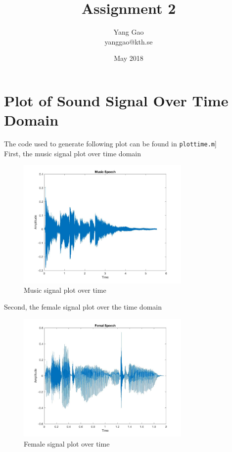 \documentclass{article}
\title{Assignment 2}
\author{Yang Gao\\
        yanggao@kth.se}
\date{May 2018}
\begin{document}
    \maketitle

    \section{Plot of Sound Signal Over Time Domain}
    The code used to generate following plot can be found in \texttt{plottime.m}]
    \\First, the music signal plot over time domain
    \begin{figure}[H]
        \begin{center}
        \leavevmode
        \includegraphics[width=0.75\textwidth]{music_time.jpg}
        \end{center}
        \caption{Music signal plot over time}
        \label{euler:1}
    \end{figure}
    \newpage
    Second, the female signal plot over the time domain
    \begin{figure}[H]
        \begin{center}
            \leavevmode
            \includegraphics[width=0.75\textwidth]{female_time.jpg}
        \end{center}
        \caption{Female signal plot over time}

    \end{figure}
\end{document}

